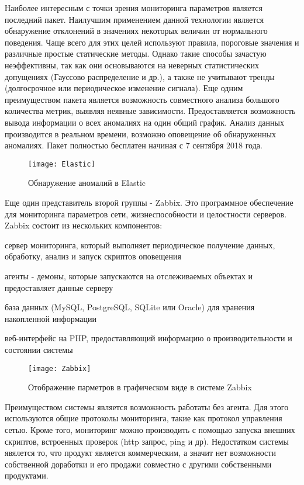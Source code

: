 Наиболее интересным с точки зрения мониторинга параметров является последний пакет. Наилучшим применением данной технологии является обнаружение отклонений в значениях некоторых величин от нормального поведения. Чаще всего для этих целей используют правила, пороговые значения и различные простые статические методы. Однако такие способы зачастую неэффективны, так как они основываются на неверных статистических допущениях (Гауссово распределение и др.), а также не учитывают тренды (долгосрочное или периодическое изменение сигнала). Еще одним преимуществом пакета является возможность совместного анализа большого количества метрик, выявляя неявные зависимости. Предоставляется возможность вывода информации о всех аномалиях на один общий график. Анализ данных производится в реальном времени, возможно оповещение об обнаруженных аномалиях. Пакет полностью бесплатен начиная с 7 сентября 2018 года. 


\begin{figure}[htbp]
	\centering
	\texttt{[image: Elastic]}
	\caption{Обнаружение аномалий в Elastic}
	\label{fig:Elastic}
\end{figure}

Еще один представитель второй группы - Zabbix. Это программное обеспечение для мониторинга параметров сети, жизнеспособности и целостности серверов. Zabbix состоит из нескольких компонентов:
\begin{itemize*}
	\item{сервер мониторинга, который выполняет периодическое получение данных, обработку, анализ и запуск скриптов оповещения}
	\item{агенты - демоны, которые запускаются на отслеживаемых объектах и предоставляет данные серверу}
	\item{база данных (MySQL, PostgreSQL, SQLite или Oracle) для хранения накопленной информации}
	\item{веб-интерфейс на PHP, предоставляющий информацию о производительности и состоянии системы}
\end{itemize*}

\begin{figure}[!htbp]
	\centering
	\texttt{[image: Zabbix]}
	\caption{Отображение парметров в графическом виде в системе Zabbix}
	\label{fig:Zabbix}
\end{figure}

Преимуществом системы является возможность работаты без агента. Для этого используются общие протоколы мониторинга, такие как протокол управления сетью.  Кроме того, мониторинг можно производить с помощью запуска внешних скриптов, встроенных проверок (http запрос, ping и др). Недостатком системы явялется то, что продукт является коммерческим, а значит нет возможности собственной доработки и его продажи совместно с другими собственными продуктами.  

